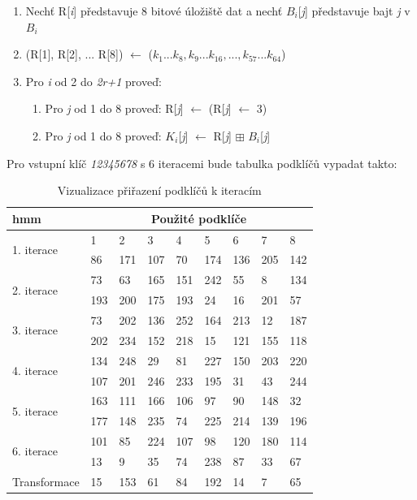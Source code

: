 \documentclass[12pt,a4paper]{article}
\begin{document}
\begin{enumerate}
\item Nechť R[\emph{i}] představuje 8 bitové úložiště dat a nechť $B_{i}$[\emph{j}] představuje bajt \emph{j} v $B_{i}$
\item (R[1], R[2], ... R[8]) $\leftarrow$ ($k_{1}...k_{8},k_{9}...k_{16},...,k_{57}...k_{64}$)
\item Pro \emph{i} od 2 do \emph{2r+1} proveď: 
\begin{enumerate}
\item Pro \emph{j} od 1 do 8 proveď: R[\emph{j}] $\leftarrow$ (R[\emph{j}] $\leftarrow$ 3)
\item Pro \emph{j} od 1 do 8 proveď: $K_{i}$[\emph{j}] $\leftarrow$ R[\emph{j}] $\boxplus$ $B_{i}$[\emph{j}]
\end{enumerate}
\end{enumerate}


Pro vstupní klíč \emph{12345678} s 6 iteracemi bude tabulka podklíčů vypadat takto:

\begin{table}[h!]
\centering
\caption{Vizualizace přiřazení podklíčů k iteracím}
    \begin{tabular}{ | l | l | l | l | l | l | l | l | l |}
    \hline
    
hmm & \multicolumn{8}{c|}{Použité podklíče}   \\   \hline  
\multirow{2}{*}{1. iterace} & 1 & 2 & 3 & 4 & 5 & 6 & 7 & 8  \\ 
 &86 &171 &107 &70 &174 &136 &205 &142 \\ \hline 
\multirow{2}{*}{2. iterace}  &73 &63 &165 &151 &242 &55 &8 &134 \\  
 &193 &200 &175 &193 &24 &16 &201 &57 \\ \hline 
\multirow{2}{*}{3. iterace}  &73 &202 &136 &252 &164 &213 &12 &187 \\  
 &202 &234 &152 &218 &15 &121 &155 &118 \\ \hline 
\multirow{2}{*}{4. iterace} &134 &248 &29 &81 &227 &150 &203 &220 \\ 
 &107 &201 &246 &233 &195 &31 &43 &244 \\ \hline 
\multirow{2}{*}{5. iterace} &163 &111 &166 &106 &97 &90 &148 &32 \\ 
 &177 &148 &235 &74 &225 &214 &139 &196 \\ \hline
\multirow{2}{*}{6. iterace}  &101 &85 &224 &107 &98 &120 &180 &114 \\ 
 &13 &9 &35 &74 &238 &87 &33 &67 \\ \hline 
Transformace &15 &153 &61 &84 &192 &14 &7 &65 \\ \hline     
\end{tabular}
\end{table}
\end{document}
